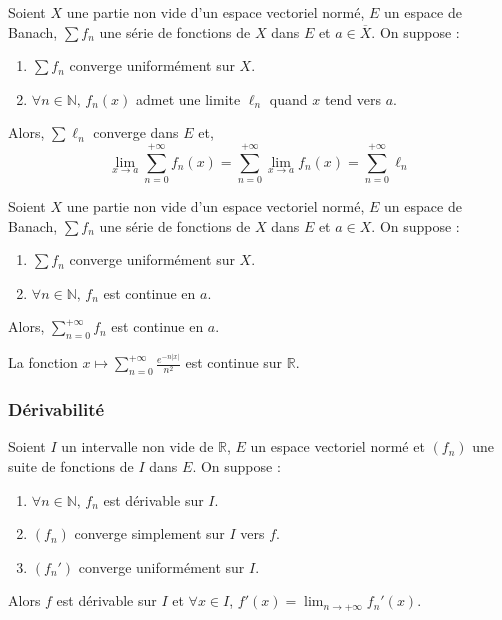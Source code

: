
  \begin{theorem}
    Soient $X$ une partie non vide d'un espace vectoriel normé, $E$ un espace de Banach, $\sum f_n$ une série de fonctions de $X$ dans $E$ et $a \in \overline{X}$. On suppose :
    \begin{enumerate}[label=(\roman*)]
      \item $\sum f_n$ converge uniformément sur $X$.
      \item $\forall n \in \mathbb{N}, \, f_n(x)$ admet une limite $\ell_n$ quand $x$ tend vers $a$.
    \end{enumerate}
    Alors, $\sum \ell_n$ converge dans $E$ et,
    \[ \lim_{x \rightarrow a} \sum_{n=0}^{+\infty} f_n(x) = \sum_{n=0}^{+\infty} \lim_{x \rightarrow a} f_n(x) = \sum_{n=0}^{+\infty} \ell_n \]
  \end{theorem}

  \begin{theorem}
    Soient $X$ une partie non vide d'un espace vectoriel normé, $E$ un espace de Banach, $\sum f_n$ une série de fonctions de $X$ dans $E$ et $a \in X$. On suppose :
    \begin{enumerate}[label=(\roman*)]
      \item $\sum f_n$ converge uniformément sur $X$.
      \item $\forall n \in \mathbb{N}, \, f_n$ est continue en $a$.
    \end{enumerate}
    Alors, $\sum_{n=0}^{+\infty} f_n$ est continue en $a$.
  \end{theorem}

  \begin{example}
    La fonction $x \mapsto \sum_{n=0}^{+\infty} \frac{e^{-n\vert x \vert}}{n^2}$ est continue sur $\mathbb{R}$.
  \end{example}

  \subsubsection{Dérivabilité}


  \begin{theorem}
    Soient $I$ un intervalle non vide de $\mathbb{R}$, $E$ un espace vectoriel normé et $(f_n)$ une suite de fonctions de $I$ dans $E$. On suppose :
    \begin{enumerate}[label=(\roman*)]
      \item $\forall n \in \mathbb{N}, \, f_n$ est dérivable sur $I$.
      \item $(f_n)$ converge simplement sur $I$ vers $f$.
      \item $(f_n')$ converge uniformément sur $I$.
    \end{enumerate}
    Alors $f$ est dérivable sur $I$ et $\forall x \in I$, $f'(x) = \lim_{n \rightarrow +\infty} f_n'(x)$.
  \end{theorem}

